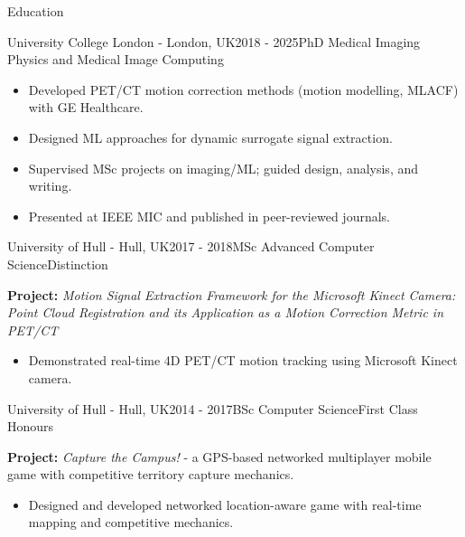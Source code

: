 \documentclass{cv}
\begin{document}
\begin{spacing}{1.1}
\begin{rSection}{Education}
\begin{rSubsection}{University College London \textnormal{- London, UK}}{2018 - 2025}{PhD Medical Imaging Physics and Medical Image Computing}{}
                \item \begin{itemize}
                    \item Developed PET/CT motion correction methods (motion modelling, MLACF) with GE Healthcare.
                    \item Designed ML approaches for dynamic surrogate signal extraction.
                    \item Supervised MSc projects on imaging/ML; guided design, analysis, and writing.
                    \item Presented at IEEE MIC and published in peer-reviewed journals.
                \end{itemize}
            \end{rSubsection}
            
            \item \begin{rSubsection}{University of Hull \textnormal{- Hull, UK}}{2017 - 2018}{MSc Advanced Computer Science}{Distinction}
                \item \textbf{Project:} \textit{Motion Signal Extraction Framework for the Microsoft Kinect Camera: Point Cloud Registration and its Application as a Motion Correction Metric in PET/CT}
                
                \item \begin{itemize}
                    \item Demonstrated real-time 4D PET/CT motion tracking using Microsoft Kinect camera.
                \end{itemize}
            \end{rSubsection}
            
            \item \begin{rSubsection}{University of Hull \textnormal{- Hull, UK}}{2014 - 2017}{BSc Computer Science}{First Class Honours}
                \item \textbf{Project:} \textit{Capture the Campus!} - a GPS-based networked multiplayer mobile game with competitive territory capture mechanics.
                
                \item \begin{itemize}
                    \item Designed and developed networked location-aware game with real-time mapping and competitive mechanics.
                \end{itemize}
            \end{rSubsection}
        \end{rSection}
        

\end{spacing}
\end{document}
